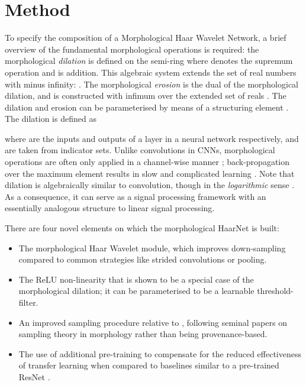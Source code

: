 \documentclass{article}
\begin{document}
\section{Method} \label{sec:method}
To specify the composition of a Morphological Haar Wavelet Network, a brief overview of the fundamental morphological operations is required:
the morphological \emph{dilation} is defined on the semi-ring  where  denotes the supremum operation and  is addition. 
This algebraic system extends the set of real numbers  with minus infinity:  \cite{ritter1996introduction}.
The morphological \emph{erosion} is the dual of the morphological dilation, and is constructed with infimum  over the extended set of reals .
The dilation and erosion can be parameterised by means of a structuring element .
The dilation is defined as

where  are the inputs and outputs of a layer in a neural network respectively, and  are taken from indicator sets.
Unlike convolutions in CNNs, morphological operations are often only applied in a channel-wise manner \cite{groenendijk2022morphpool}; back-propagation over the maximum element results in slow and complicated learning \cite{groenendijk2022backprop}.
Note that dilation is algebraically similar to convolution, though in the \emph{logarithmic} sense \cite{burgeth2005logarithmic}.
As a consequence, it can serve as a signal processing framework with an essentially analogous structure to linear signal processing.

There are four novel elements on which the morphological HaarNet is built:
\begin{itemize}
    \item The morphological Haar Wavelet module, which improves down-sampling compared to common strategies like strided convolutions or pooling.
    \item The ReLU non-linearity that is shown to be a special case of the morphological dilation; it can be parameterised to be a learnable threshold-filter.
    \item An improved sampling procedure relative to \cite{groenendijk2022morphpool}, following seminal papers on sampling theory in morphology \cite{heijmans1991morphological,heijmans2000nonlinear} rather than being provenance-based.
    \item The use of additional pre-training to compensate for the reduced effectiveness of transfer learning when compared to baselines similar to a pre-trained ResNet \cite{he2016deep}.
\end{itemize}
\end{document}
